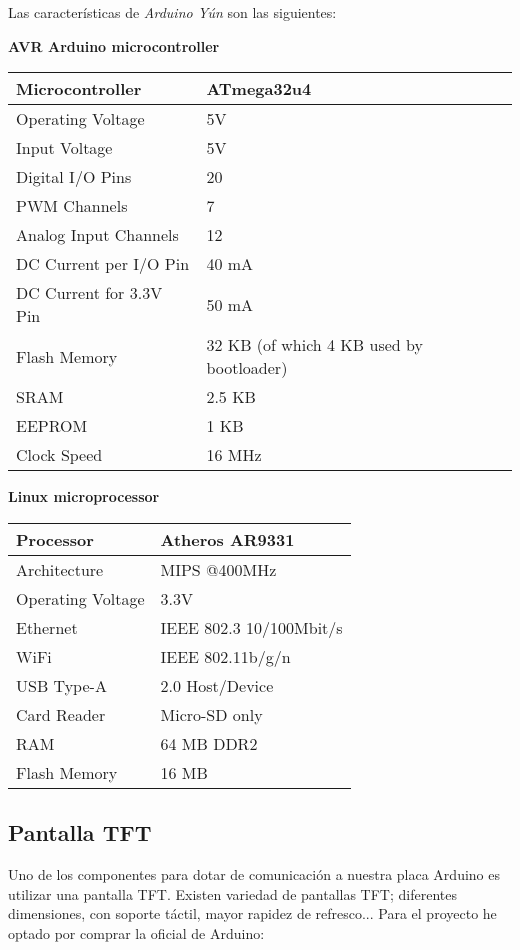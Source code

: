 Las características de \emph{Arduino Yún} son las siguientes:

\textbf{AVR Arduino microcontroller}

\begin{tabular}{| l | l |}
\hline
Microcontroller & ATmega32u4 \\ \hline
Operating Voltage & 5V \\ \hline
Input Voltage & 5V \\ \hline
Digital I/O Pins & 20 \\ \hline
PWM Channels & 7 \\ \hline
Analog Input Channels & 12 \\ \hline
DC Current per I/O Pin & 40 mA \\ \hline
DC Current for 3.3V Pin & 50 mA \\ \hline
Flash Memory & 32 KB (of which 4 KB used by bootloader) \\ \hline
SRAM & 2.5 KB \\ \hline
EEPROM & 1 KB \\ \hline
Clock Speed & 16 MHz \\ \hline
\end{tabular}

\textbf{Linux microprocessor}

\begin{tabular}{| l | l |}
\hline
Processor & Atheros AR9331 \\ \hline
Architecture & MIPS @400MHz \\ \hline
Operating Voltage & 3.3V \\ \hline
Ethernet & IEEE 802.3 10/100Mbit/s \\ \hline
WiFi & IEEE 802.11b/g/n \\ \hline
USB Type-A & 2.0 Host/Device \\ \hline
Card Reader & Micro-SD only \\ \hline
RAM & 64 MB DDR2 \\ \hline
Flash Memory & 16 MB \\ \hline
\end{tabular}


\subsection{Pantalla TFT}

Uno de los componentes para dotar de comunicación a nuestra placa Arduino es utilizar una pantalla TFT. Existen variedad de pantallas TFT; diferentes dimensiones, con soporte táctil, mayor rapidez de refresco... Para el proyecto he optado por comprar la oficial de Arduino:

